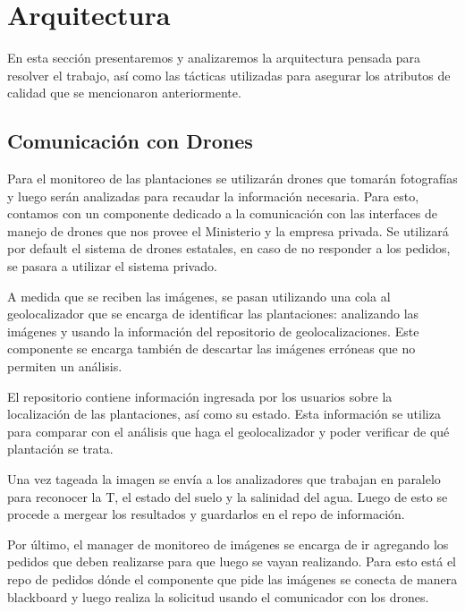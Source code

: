 \section{Arquitectura}

En esta secci\'on presentaremos y analizaremos la arquitectura pensada para resolver el trabajo, as\'i como las t\'acticas utilizadas para asegurar los atributos de calidad que se mencionaron anteriormente.

\subsection{Comunicaci\'on con Drones}

Para el monitoreo de las plantaciones se utilizar\'an drones que tomar\'an fotograf\'ias y luego ser\'an analizadas para recaudar la informaci\'on necesaria.  Para esto, contamos con un componente dedicado a la comunicaci\'on con las interfaces de manejo de drones que nos provee el Ministerio y la empresa privada. Se utilizar\'a por default el sistema de drones estatales, en caso de no responder a los pedidos, se pasara a utilizar el sistema privado.

A medida que se reciben las im\'agenes, se pasan utilizando una cola al geolocalizador que se encarga de identificar las plantaciones: analizando las im\'agenes y usando la informaci\'on del repositorio de geolocalizaciones. Este componente se encarga tambi\'en de descartar las im\'agenes err\'oneas que no permiten un an\'alisis.

El repositorio contiene informaci\'on ingresada por los usuarios sobre la localizaci\'on de las plantaciones, as\'i como su estado. Esta informaci\'on se utiliza para comparar con el an\'alisis que haga el geolocalizador y poder verificar de qu\'e plantaci\'on se trata.

Una vez tageada la imagen se env\'ia a los analizadores que trabajan en paralelo para reconocer la T\textdegree, el estado del suelo y la salinidad del agua. Luego de esto se procede a mergear los resultados y guardarlos en el repo de informaci\'on.

Por \'ultimo, el manager de monitoreo de im\'agenes se encarga de ir agregando los pedidos que deben realizarse para que luego se vayan realizando. Para esto est\'a el repo de pedidos d\'onde el componente que pide las im\'agenes se conecta de manera blackboard y luego realiza la solicitud usando el comunicador con los drones.

